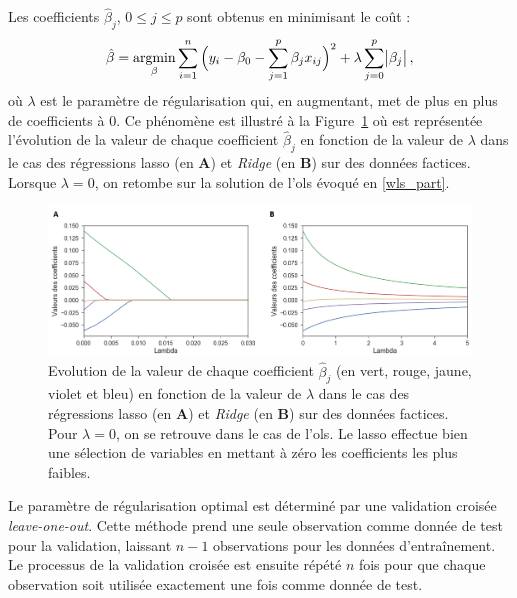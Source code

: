 Les coefficients $\hat{\beta}_{j}$, $0 \leq j \leq p$ sont obtenus en minimisant le coût :
\begin{equation}
\label{eq:factors_lasso-minimization}
\hat{\beta} = \operatorname*{argmin}_\beta \sum_{i=1}^{n} \Big(y_i - \beta_{0} - \sum_{j=1}^{p}\beta_{j}x_{ij}\Big)^2 + \lambda \sum_{j=0}^{p}\abs{\beta_{j}},
\end{equation} 
où $\lambda$ est le paramètre de régularisation qui, en augmentant, met de plus en plus de coefficients à 0. Ce phénomène est illustré à la 
Figure~\ref{Figure:factors_comparison_lasso_ridge_ols_lasso} où est représentée l'évolution de la valeur de chaque coefficient $\hat{\beta}_{j}$ en fonction de
la valeur de $\lambda$ dans le cas des régressions \gls{lasso} (en \textbf{A}) et \textit{Ridge} (en \textbf{B}) sur des données factices. Lorsque $\lambda = 0$, on retombe
sur la solution de l'\gls{ols} évoqué en \ref{wls_part}.

\begin{figure}[h!]
  \centering
	\includegraphics[width=1.0\linewidth]{figures/chapter-3/comparison-lasso-ridge-ols-lasso} 
  \caption[Comparaison des régressions \gls{lasso} et \textit{Ridge} sur des données factices.]{Evolution de la valeur de chaque coefficient $\hat{\beta}_{j}$ (en vert, rouge, jaune, violet et bleu) en fonction de
  la valeur de $\lambda$ dans le cas des régressions \gls{lasso} (en \textbf{A}) et \textit{Ridge} (en \textbf{B}) sur des données factices. Pour $\lambda = 0$, on se retrouve
  dans le cas de l'\gls{ols}. Le \gls{lasso} effectue bien une sélection de variables en mettant à zéro les coefficients les plus faibles.}
  \label{Figure:factors_comparison_lasso_ridge_ols_lasso}
\end{figure}

Le paramètre de régularisation optimal est déterminé par une validation croisée \textit{leave-one-out}. Cette méthode prend une seule observation 
comme donnée de test pour la validation, laissant $n - 1$ observations pour les données d'entraînement. Le processus de la validation croisée est 
ensuite répété $n$ fois pour que chaque observation soit utilisée exactement une fois comme donnée de test. 

